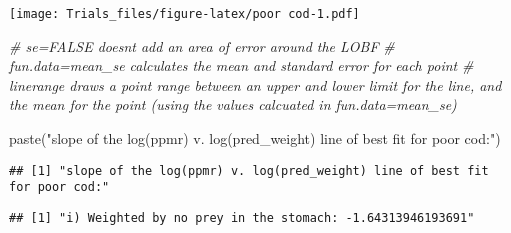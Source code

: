 \documentclass[
]{article}
\newenvironment{Shaded}{\begin{snugshade}}{\end{snugshade}}
\newcommand{\AttributeTok}[1]{\textcolor[rgb]{0.77,0.63,0.00}{#1}}
\newcommand{\CommentTok}[1]{\textcolor[rgb]{0.56,0.35,0.01}{\textit{#1}}}
\newcommand{\DecValTok}[1]{\textcolor[rgb]{0.00,0.00,0.81}{#1}}
\newcommand{\FunctionTok}[1]{\textcolor[rgb]{0.00,0.00,0.00}{#1}}
\newcommand{\NormalTok}[1]{#1}
\newcommand{\OtherTok}[1]{\textcolor[rgb]{0.56,0.35,0.01}{#1}}
\newcommand{\SpecialCharTok}[1]{\textcolor[rgb]{0.00,0.00,0.00}{#1}}
\newcommand{\StringTok}[1]{\textcolor[rgb]{0.31,0.60,0.02}{#1}}
\begin{document}
\texttt{[image: Trials\_files/figure-latex/poor cod-1.pdf]}

\begin{Shaded}
\begin{Highlighting}[]
\CommentTok{\# se=FALSE doesn\textquotesingle{}t add an area of error around the LOBF }
\CommentTok{\# fun.data=mean\_se calculates the mean and standard error for each point}
\CommentTok{\# linerange draws a point range between an upper and lower limit for the line, and the mean for the point (using the values calcuated in \textquotesingle{}fun.data=mean\_se\textquotesingle{})}

\FunctionTok{paste}\NormalTok{(}\StringTok{"slope of the log(ppmr) v. log(pred\_weight) line of best fit for poor cod:"}\NormalTok{)}
\end{Highlighting}
\end{Shaded}

\begin{verbatim}
## [1] "slope of the log(ppmr) v. log(pred_weight) line of best fit for poor cod:"
\end{verbatim}

\begin{Shaded}
\end{Shaded}

\begin{verbatim}
## [1] "i) Weighted by no prey in the stomach: -1.64313946193691"
\end{verbatim}

\begin{Shaded}
\end{Shaded}
\end{document}
